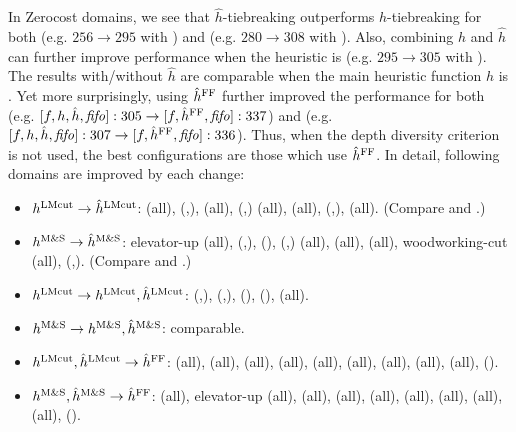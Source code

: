 In Zerocost domains, we see that $\hat{h}$-tiebreaking outperforms $h$-tiebreaking for both \lmcut (e.g. $256\rightarrow 295$ with \fifo) and \mands (e.g. $280\rightarrow 308$ with \fifo).
Also, combining $h$ and $\hat{h}$ can further improve performance when the heuristic is \lmcut (e.g. $295\rightarrow 305$ with \fifo). The results with/without $\hat{h}$ are comparable when the main heuristic function $h$ is \mands.
% 
Yet more surprisingly, using $\hat{h}^{\text{FF}}$ further improved the performance for both \lmcut
(e.g. $[f,h,\hat{h},{\text{\textit{fifo}}}]:305 \rightarrow [f,\hat{h}^{\text{FF}},{\text{\textit{fifo}}}]:337$) and \mands 
(e.g. $[f,h,\hat{h},{\text{\textit{fifo}}}]:307 \rightarrow [f,\hat{h}^{\text{FF}},{\text{\textit{fifo}}}]:336$).
% 
Thus, when the depth diversity criterion  is not used, the best configurations are those
which use $\hat{h}^{\text{FF}}$.
In detail, following domains are improved by each change:
\begin{itemize}
 \item \textbf{$h^\text{LMcut} \to \hat{h}^\text{LMcut}$}:  (all),  (\fifo,\ro),  (all),  (\lifo,\ro)  (all),  (all),  (\lifo,\ro),  (all). (Compare  and .)
 \item \textbf{$h^\text{M\&S} \to \hat{h}^\text{M\&S}$}: elevator-up (all),  (\fifo,\ro),  (\ro),  (\fifo,\lifo)  (all),  (all),  (all), wood\-working-cut (all),  (\lifo,\ro). (Compare  and .)
 \item \textbf{$h^\text{LMcut} \to h^\text{LMcut},\hat{h}^\text{LMcut}$}:  (\fifo,\ro),  (\fifo,\ro),  (\lifo),  (\fifo),  (all).
 \item \textbf{$h^\text{M\&S} \to h^\text{M\&S},\hat{h}^\text{M\&S}$}: comparable.
 \item \textbf{$h^\text{LMcut},\hat{h}^\text{LMcut} \to \hat{h}^{\text{FF}}$}:  (all),  (all),  (all),  (all),  (all),  (all),  (all),  (all),  (all),  (\ro).
 \item \textbf{$h^\text{M\&S},\hat{h}^\text{M\&S} \to \hat{h}^{\text{FF}}$}:  (all), elevator-up (all),  (all),  (all),  (all),  (all),  (all),  (all),  (all),  (\ro).
\end{itemize}
 
